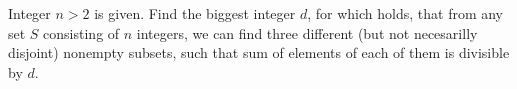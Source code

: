 Integer $n>2$ is given. Find the biggest integer $d$, for which holds, that from any set $S$ consisting of $n$ integers, we can find three different (but not necesarilly disjoint) nonempty subsets, such that sum of elements of each of them is divisible by $d$.